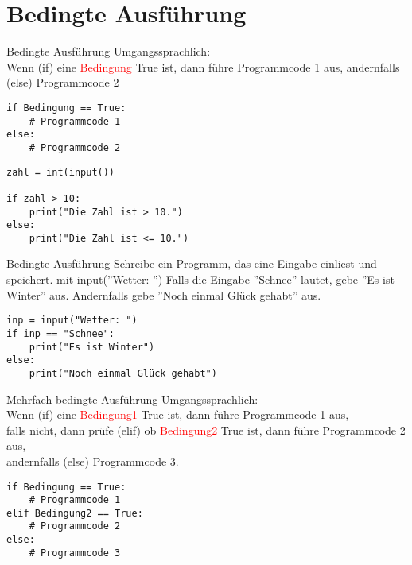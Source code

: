 \section{Bedingte Ausführung}

\begin{frame}[fragile]{Bedingte Ausführung}
Umgangssprachlich:\\ Wenn (if) eine \textcolor{red}{Bedingung} True ist, dann führe Programmcode 1 aus, andernfalls (else) Programmcode 2\\

\begin{lstlisting}
if Bedingung == True:
	# Programmcode 1 
else:
	# Programmcode 2 
\end{lstlisting}

\begin{lstlisting}
zahl = int(input())

if zahl > 10:
	print("Die Zahl ist > 10.")
else:
	print("Die Zahl ist <= 10.")
\end{lstlisting}
\end{frame}

\begin{frame}[fragile]{Bedingte Ausführung}
Schreibe ein Programm, das eine Eingabe einliest und speichert. mit input(''Wetter: '')
Falls die Eingabe ''Schnee'' lautet, gebe ''Es ist Winter'' aus. Andernfalls gebe ''Noch einmal Glück gehabt'' aus.
\pause{}
\begin{lstlisting}
inp = input("Wetter: ")
if inp == "Schnee":
    print("Es ist Winter")
else:
    print("Noch einmal Glück gehabt")
\end{lstlisting}
\end{frame}

\begin{frame}[fragile]{Mehrfach bedingte Ausführung}
Umgangssprachlich:\\ Wenn (if) eine \textcolor{red}{Bedingung1} True ist, dann führe Programmcode 1 aus, \\falls nicht, dann prüfe (elif) ob \textcolor{red}{Bedingung2} True ist, dann führe Programmcode 2 aus, \\andernfalls (else) Programmcode 3.\\

\begin{lstlisting}
if Bedingung == True:
    # Programmcode 1
elif Bedingung2 == True:
    # Programmcode 2
else:
    # Programmcode 3
\end{lstlisting}
\end{frame}



